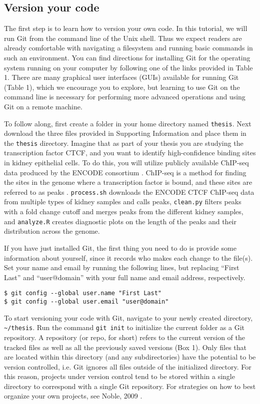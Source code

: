 \subsection{Version your code}

The first step is to learn how to version your own code.
In this tutorial, we will run Git from the command line of the Unix shell.
Thus we expect readers are already comfortable with navigating a filesystem and running basic commands in such an environment.
You can find directions for installing Git for the operating system running on your computer by following one of the links provided in Table 1.
There are many graphical user interfaces (GUIs) available for running Git (Table 1), which we encourage you to explore, but learning to use Git on the command line is necessary for performing more advanced operations and using Git on a remote machine.

To follow along, first create a folder in your home directory named \verb|thesis|.
Next download the three files provided in Supporting Information and place them in the \verb|thesis| directory.
Imagine that as part of your thesis you are studying the transcription factor CTCF, and you want to identify high-confidence binding sites in kidney epithelial cells.
To do this, you will utilize publicly available ChIP-seq data produced by the ENCODE consortium \cite{22955616}.
ChIP-seq is a method for finding the sites in the genome where a transcription factor is bound, and these sites are referred to as peaks \cite{24244136}.
\verb|process.sh| downloads the ENCODE CTCF ChIP-seq data from multiple types of kidney samples and calls peaks,
\verb|clean.py| filters peaks with a fold change cutoff and merges peaks from the different kidney samples,
and \verb|analyze.R| creates diagnostic plots on the length of the peaks and their distribution across the genome.

If you have just installed Git, the first thing you need to do is provide some information about yourself, since it records who makes each change to the file(s).
Set your name and email by running the following lines, but replacing ``First Last'' and ``user@domain'' with your full name and email address, respectively.

\begin{verbatim}
$ git config --global user.name "First Last"
$ git config --global user.email "user@domain"
\end{verbatim}

To start versioning your code with Git, navigate to your newly created directory, \verb|~/thesis|.
Run the command \verb|git init| to initialize the current folder as a Git repository.
A repository (or repo, for short) refers to the current version of the tracked files as well as all the previously saved versions (Box 1).
Only files that are located within this directory (and any subdirectories) have the potential to be version controlled,
i.e. Git ignores all files outside of the initialized directory.
For this reason, projects under version control tend to be stored within a single directory to correspond with a single Git repository.
For strategies on how to best organize your own projects, see Noble, 2009 \cite{19649301}.

